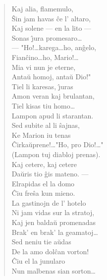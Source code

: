 \begin{verse}
                        Kaj alia, flamemulo,\\
                        \^Sin jam havas \^ce l' altaro,\\
                        Kaj solene --- en la lito ---\\
                        Sonas \^{\j}ura promesaro\dots\\
                        --- "Ho!\dots karega\dots ho, an\^gelo,\\
                        Fian\^cino\dots ho, Mario!\dots\\
                        Mia vi nun je eterne,\\
                        Anta\u u homoj, anta\u u Dio!"\\
                        Tiel li karesas, \^{\j}uras\\
                        Amon veran kaj brulantan,\\
                        Tiel kisas tiu homo\dots\\
                        Lampon apud li starantan.\\
                        Sed subite al li \^sajnas,\\
                        Ke Marion iu tenas\\
                        \^Cirka\u uprene!\dots "Ho, pro Dio!\dots"\\
                        (Lampon tuj diabloj prenas).\\
                        Kaj cetere, kaj cetere\\
                        Da\u uris tio \^gis mateno. ---\\
                        Elrapidas el la domo\\
                        \^Ciu fre\^sa kun mieno.\\
                        La gastinojn de l' hotelo\\
                        Ni jam vidas sur la stratoj,\\
                        Kaj jen balda\u u promenadas\\
                        Brak' en brak' la geamatoj\dots\\
                        Sed neniu tie a\u udas\\
                        De la amo dol\^can vorton!\\
                        \^Ciu el la junularo\\
                        Nun malbenas sian sorton\dots


\end{verse}
